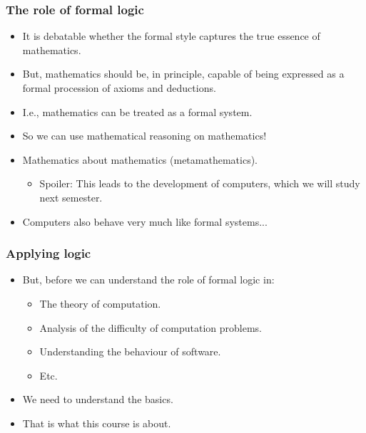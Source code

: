 \documentclass[handout]{beamer}
\begin{document}
\begin{frame}
\frametitle{The role of formal logic}
\begin{itemize}
\item It is debatable whether the formal style captures the true essence of mathematics.
\vspace{0.2cm}
\item But, mathematics should be, in principle, capable of being expressed as a formal procession of axioms and deductions. 
\vspace{0.2cm}
\item I.e., mathematics can be treated as a formal system.
\vspace{0.2cm}
\item So we can use mathematical reasoning on mathematics! 
\vspace{0.2cm}
\item Mathematics about mathematics (metamathematics). 
\begin{itemize}
\item Spoiler: This leads to the development of computers, which we will study next semester. 
\end{itemize}
\vspace{0.2cm}
\item Computers also behave very much like formal systems...
\end{itemize}
\end{frame}

\begin{frame}
\frametitle{Applying logic}
\begin{itemize}
\item But, before we can understand the role of formal logic in:
\vspace{0.2cm}
\begin{itemize}
\item The theory of computation.
\vspace{0.2cm}
\item Analysis of the difficulty of computation problems.
\vspace{0.2cm}
\item Understanding the behaviour of software.
\vspace{0.2cm}
\item Etc.  
\end{itemize}
\vspace{0.2cm}
\item We need to understand the basics. 
\vspace{0.2cm}
\item That is what this course is about. 
\end{itemize}
\end{frame}
\end{document}
